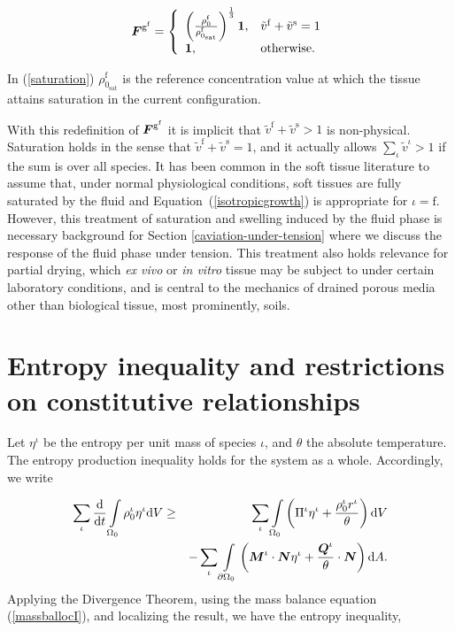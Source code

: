 \begin{equation}
\mbox{\boldmath$ F$}^{\mathrm{g}^\mathrm{f}} = \left\{ \begin{array}{ll}  \left(
\frac{\rho_0^\mathrm{f}}{\rho_{0_{\mathrm{sat}}}^\mathrm{f}} \right)^
{\frac{1}{3}}{\bf 1},&
\tilde{v}^\mathrm{f} + \tilde{v}^\mathrm{s} = 1 \\ {\bf 1},& \mathrm{otherwise.}
\end{array}\right.
\label{saturation}
\end{equation}

\noindent In (\ref{saturation}) $\rho_{0_{\mathrm{sat}}}^\mathrm{f}$
is the reference concentration value at which the tissue attains saturation
in the current configuration.

With this redefinition of $\mbox{\boldmath$ F$}^{\mathrm{g}^\mathrm{f}}$ it is implicit
that $\tilde{v}^\mathrm{f} + \tilde{v}^\mathrm{s} > 1$ is
non-physical. Saturation holds in the sense that $\tilde{v}^\mathrm{f} +
\tilde{v}^\mathrm{s} = 1$, and it actually allows $\sum_\iota
\tilde{v}^\iota > 1$ if the sum is over all species. It has been
common in the soft tissue literature to assume that, 
under normal physiological 
conditions, soft tissues are fully saturated by the fluid and
\mbox{Equation~(\ref{isotropicgrowth})} is appropriate for $\iota =
\mathrm{f}$. However, this treatment of saturation and swelling
induced by the fluid phase is necessary background for Section
\ref{caviation-under-tension} where we 
discuss the response of the fluid phase under tension. This treatment
also holds relevance for partial drying,
which \emph{ex vivo} or \emph{in vitro} tissue may be subject to under
certain laboratory conditions, and is central to the mechanics of
drained porous media other than biological tissue, most prominently,
soils.

\section{Entropy inequality and restrictions on constitutive
  relationships}
\label{entropy-inequality}

Let $\eta^\iota$ be the entropy per unit mass of species $\iota$,
and $\theta$ the absolute temperature. The entropy production
inequality holds for the system as a whole. Accordingly, we write

\begin{eqnarray}
\sum\limits_{\iota}\frac{\mathrm{d}}{\mathrm{d}t}
\int\limits_{\Omega_0} \rho_0^\iota \eta^\iota \mathrm{d}V &\geq&
\sum\limits_{\iota}\int\limits_{\Omega_0}\left(
\Pi^\iota \eta^\iota + \frac{\rho_0^\iota r^\iota}{\theta}\right) \mathrm{d}V\nonumber\\
& & - \sum\limits_{\iota}\int\limits_{\partial \Omega_0}
\left(\mbox{\boldmath$ M$}^\iota \cdot \mbox{\boldmath$ N$}\eta^\iota + \frac{\mbox{\boldmath$ Q$}^\iota}{\theta}
\cdot \mbox{\boldmath$ N$} \right)\mathrm{d}A.
\end{eqnarray}
\noindent Applying the Divergence Theorem, using the mass balance
equation (\ref{massballocI}), and localizing the result, we have
the entropy inequality,

